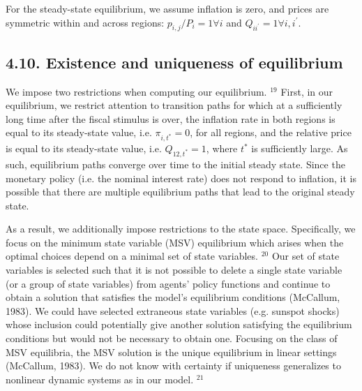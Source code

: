 \documentclass[10pt]{article}
\begin{document}
For the steady-state equilibrium, we assume inflation is zero, and prices are symmetric within and across regions: $p_{i, j} / P_{i}=1 \forall i$ and $Q_{i i^{\prime}}=1 \forall i, i^{\prime}$.

\subsection*{4.10. Existence and uniqueness of equilibrium}
We impose two restrictions when computing our equilibrium. ${ }^{19}$ First, in our equilibrium, we restrict attention to transition paths for which at a sufficiently long time after the fiscal stimulus is over, the inflation rate in both regions is equal to its steady-state value, i.e. $\pi_{i, t^{*}}=0$, for all regions, and the relative price is equal to its steady-state value, i.e. $Q_{12, t^{*}}=1$, where $t^{*}$ is sufficiently large. As such, equilibrium paths converge over time to the initial steady state. Since the monetary policy (i.e. the nominal interest rate) does not respond to inflation, it is possible that there are multiple equilibrium paths that lead to the original steady state.

As a result, we additionally impose restrictions to the state space. Specifically, we focus on the minimum state variable (MSV) equilibrium which arises when the optimal choices depend on a minimal set of state variables. ${ }^{20}$ Our set of state variables is selected such that it is not possible to delete a single state variable (or a group of state variables) from agents' policy functions and continue to obtain a solution that satisfies the model's equilibrium conditions (McCallum, 1983). We could have selected extraneous state variables (e.g. sunspot shocks) whose inclusion could potentially give another solution satisfying the equilibrium conditions but would not be necessary to obtain one. Focusing on the class of MSV equilibria, the MSV solution is the unique equilibrium in linear settings (McCallum, 1983). We do not know with certainty if uniqueness generalizes to nonlinear dynamic systems as in our model. ${ }^{21}$
\end{document}
